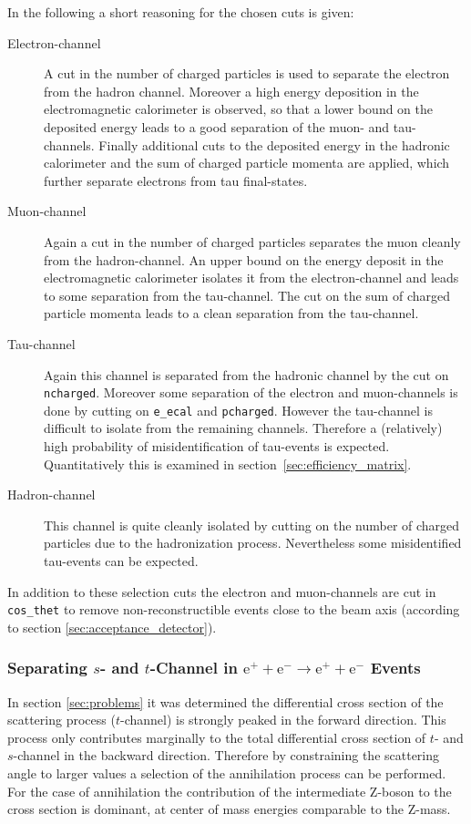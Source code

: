 \documentclass[11pt, a4paper]{article}
\numberwithin{equation}{section}
\begin{document}
\noindent In the following a short reasoning for the chosen cuts is given:
\begin{description}
	\item[Electron-channel] A cut in the number of charged particles is used to separate the electron from the hadron channel.
	Moreover a high energy deposition in the electromagnetic calorimeter is observed, so that a lower bound on the deposited energy leads to a good separation of the muon- and tau-channels.
	Finally additional cuts to the deposited energy in the hadronic calorimeter and the sum of charged particle momenta are applied, which further separate electrons from tau final-states.
	
	\item[Muon-channel] Again a cut in the number of charged particles separates the muon cleanly from the hadron-channel.
	An upper bound on the energy deposit in the electromagnetic calorimeter isolates it from the electron-channel and leads to some separation from the tau-channel.
	The cut on the sum of charged particle momenta leads to a clean separation from the tau-channel.	
	
	\item[Tau-channel] Again this channel is separated from the hadronic channel by the cut on \texttt{ncharged}.
	Moreover some separation of the electron and muon-channels is done by cutting on \texttt{e\_ecal} and \texttt{pcharged}.
	However the tau-channel is difficult to isolate from the remaining channels.
	Therefore a (relatively) high probability of misidentification of tau-events is expected.
	Quantitatively this is examined in section~\ref{sec:efficiency_matrix}. 
	
	\item[Hadron-channel] This channel is quite cleanly isolated by cutting on the number of charged particles due to the hadronization process.
	Nevertheless some misidentified tau-events can be expected.
\end{description}
In addition to these selection cuts the electron and muon-channels are cut in \texttt{cos\_thet} to remove non-reconstructible events close to the beam axis (according to section \ref{sec:acceptance_detector}).

\subsubsection{Separating $s$- and $t$-Channel in $\mathrm{e}^+ + \mathrm{e}^- \rightarrow \mathrm{e}^+ + \mathrm{e}^-$ Events}
\label{sec:s_t_channel_separation}
In section \ref{sec:problems} it was determined the differential cross section of the scattering process ($t$-channel) is strongly peaked in the forward direction.
This process only contributes marginally to the total differential cross section of $t$- and $s$-channel in the backward direction.
Therefore by constraining the scattering angle to larger values a selection of the annihilation process can be performed.
For the case of annihilation the contribution of the intermediate Z-boson to the cross section is dominant, at center of mass energies comparable to the Z-mass.
\end{document}
